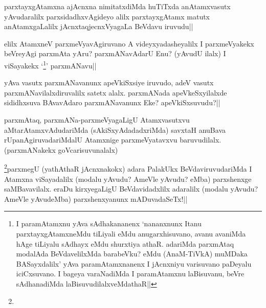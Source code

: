 \begin{artha} 
parxtayxgAtamxna ajAcnxna nimitatxdiMda huTiTxda anAtamxvasutx 
yAvudaralilx parxsidadhxvAgideyo alilx parxtayxgAtamx matutx 
anAtamxgaLalilx jAcnxtaqjecnxVyagaLa BeVdavu iruvudu||
\end{artha}


\begin{artha} 
elilx AtamxneV parxmeVyavAgiruvano A videyxyadasheyalilx I 
parxmeVyakekx beVreyAgi parxmAta yAru? parxmANavAdarU Enu? (yAvudU 
ilalx) I viSayakekx `\footnote[1]{I paramAtamxnu yAva sAdhakananenx 
`nananxnunx Itanu parxtayxgAtamxneMdu tiLiyali eMdu anugarxhisuvano, 
avanu avaniMda hAge tiLiyalu sAdhayx eMdu shurxtiya athaR. adariMda 
parxmAtaq modalAda BeVdavelilxMda barabeVku? eMdu (AnaM-TiVkA) muMDaka 
BASayxdalilx' yAva paramAtamxnanenx I jAcnxniyu varisuvano paDeyalu 
iciCxsuvano. I bageya varaNadiMda I paramAtamxnu laBisuvanu, beVre 
sAdhanadiMda laBisuvudilalxveMdathaR||}\stext' parxmANavu||
\end{artha}


\begin{artha} 
yAva vasutx parxmANavanunx apeVkiSxsiye iruvudo, adeV vasutx 
parxmANavilalxdiruvalilx satetx alalx. parxmANada apeVkeSxyilalxde 
sididhxsuva BAvavAdaro parxmANavanunx Eke? apeVkiSxsuvudu?||
\end{artha}


\begin{artha} 
parxmAtaq, parxmANa-parxmeVyagaLigU Atamxvasutxvu 
aMtarAtamxvAdudariMda (sAkiSxyAdadadxriMda) savxtaH anuBava 
rUpanAgiruvadariMdalU Atamxnige parxmeVyatavxvu baruvudilalx. 
(parxmANakekx goVcarisuvunalalx)
\end{artha}


\begin{artha} 
\footnote[1]{}parxmegU (yathAthaR jAcnxnakokx) adara PalakUkx 
BeVdaviruvudariMda I Atamxna viSayadalilx (modalu yAvudu? AmeVle 
yAvudu? eMba) parxshenxge saMBavavilalx. eraDu kirxyegaLigU 
BeVdavidadxlilx adaralilx (modalu yAvudu? AmeVle yAvudeMba) 
parxshenxyanunx mADuvadaSeTx!||
\end{artha}

